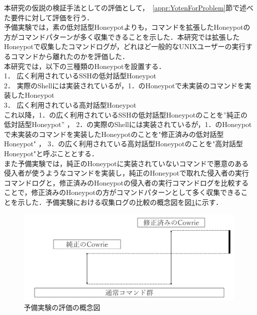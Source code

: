 本研究の仮説の検証手法としての評価として，~\ref{appr:YotenForProblem}節で述べた要件に対して評価を行う．\\
予備実験では，素の低対話型Honeypotよりも，コマンドを拡張したHoneypotの方がコマンドパターンが多く収集できることを示した．本研究では拡張したHoneypotで収集したコマンドログが，どれほど一般的なUNIXユーザーの実行するコマンドから離れたのかを評価した．\\
本研究では，以下の三種類のHoneypotを設置する．\\
1． 広く利用されているSSHの低対話型Honeypot\\
2． 実際のShellには実装されているが，1．のHoneypotで未実装のコマンドを実装したHoneypot\\
3． 広く利用されている高対話型Honeypot\\

これ以降，1．の広く利用されているSSHの低対話型Honeypotのことを”純正の低対話型Honeypot” ， 2．の実際のShellには実装されているが，1．のHoneypotで未実装のコマンドを実装したHoneypotのことを"修正済みの低対話型Honeypot" ， 3．の広く利用されている高対話型Honeypotのことを"高対話型Honeypot"と呼ぶこととする．\\


また予備実験では，純正のHoneypotに実装されていないコマンドで悪意のある侵入者が使うようなコマンドを実装し，純正のHoneypotで取れた侵入者の実行コマンドログと，修正済みのHoneypotの侵入者の実行コマンドログを比較することで，修正済みのHoneypotの方がコマンドパターンとして多く収集できることを示した．予備実験における収集ログの比較の概念図を図\ref{fig:yobigainen}に示す．

\begin{figure}[htbp]
    \centering
    \includegraphics[width=1.0\textwidth]{figures/termhyoka.png}
    \caption{予備実験の評価の概念図}
    \label{fig:yobigainen}
\end{figure}

